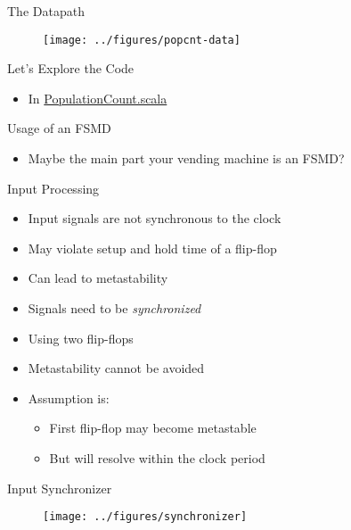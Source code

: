 \begin{frame}[fragile]{The Datapath}
\begin{figure}
  \texttt{[image: ../figures/popcnt-data]}
\end{figure}
\end{frame}

\begin{frame}[fragile]{Let's Explore the Code}
\begin{itemize}
\item In \href{https://github.com/schoeberl/chisel-book/blob/master/src/main/scala/PopulationCount.scala}{PopulationCount.scala}
\end{itemize}
\end{frame}

\begin{frame}[fragile]{Usage of an FSMD}
\begin{itemize}
\item Maybe the main part your vending machine is an FSMD?
\end{itemize}
\end{frame}

\begin{frame}[fragile]{Input Processing}
\begin{itemize}
\item Input signals are not synchronous to the clock
\item May violate setup and hold time of a flip-flop
\item Can lead to metastability
\item Signals need to be \emph{synchronized}
\item Using two flip-flops
\item Metastability cannot be avoided
\item Assumption is:
\begin{itemize}
\item First flip-flop may become metastable
\item But will resolve within the clock period
\end{itemize}
\end{itemize}
\end{frame}

\begin{frame}[fragile]{Input Synchronizer}
\begin{figure}
  \texttt{[image: ../figures/synchronizer]}
\end{figure}
\end{frame}

